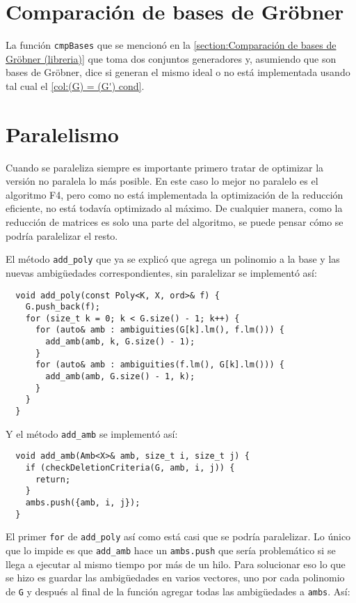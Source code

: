 \documentclass[12pt]{report}
\theoremstyle{customstyle}
\theoremstyle{factstyle}
\begin{document}
\section{Comparación de bases de Gröbner}

La función \texttt{cmpBases} que se mencionó en la \cref{section:Comparación de bases de Gröbner (libreria)} que toma dos conjuntos generadores y, asumiendo que son bases de Gröbner, dice si generan el mismo ideal o no está implementada usando tal cual el \cref{col:(G) = (G') cond}.

\section{Paralelismo}

Cuando se paraleliza siempre es importante primero tratar de optimizar la versión no paralela lo más posible. En este caso lo mejor no paralelo es el algoritmo F4, pero como no está implementada la optimización de la reducción eficiente, no está todavía optimizado al máximo. De cualquier manera, como la reducción de matrices es solo una parte del algoritmo, se puede pensar cómo se podría paralelizar el resto.

El método \texttt{add\_poly} que ya se explicó que agrega un polinomio a la base y las nuevas ambigüedades correspondientes, sin paralelizar se implementó así:

\begin{verbatim}
  void add_poly(const Poly<K, X, ord>& f) {
    G.push_back(f);
    for (size_t k = 0; k < G.size() - 1; k++) {
      for (auto& amb : ambiguities(G[k].lm(), f.lm())) {
        add_amb(amb, k, G.size() - 1);
      }
      for (auto& amb : ambiguities(f.lm(), G[k].lm())) {
        add_amb(amb, G.size() - 1, k);
      }
    }
  }
\end{verbatim}

Y el método \texttt{add\_amb} se implementó así:

\begin{verbatim}
  void add_amb(Amb<X>& amb, size_t i, size_t j) {
    if (checkDeletionCriteria(G, amb, i, j)) {
      return;
    }
    ambs.push({amb, i, j});
  }
\end{verbatim}

El primer \texttt{for} de \texttt{add\_poly} así como está casi que se podría paralelizar. Lo único que lo impide es que \texttt{add\_amb} hace un \texttt{ambs.push} que sería problemático si se llega a ejecutar al mismo tiempo por más de un hilo. Para solucionar eso lo que se hizo es guardar las ambigüedades en varios vectores, uno por cada polinomio de \texttt{G} y después al final de la función agregar todas las ambigüedades a \texttt{ambs}. Así:
\end{document}
